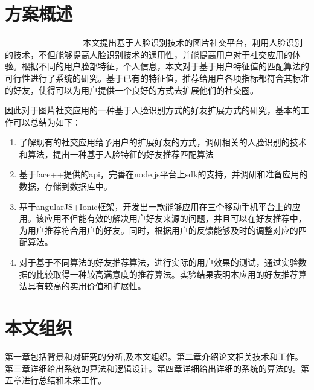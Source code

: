 \section{方案概述}
􏰉􏴳􏰭􏴴􏴵􏴶􏴷􏰿􏴸􏴹􏴘􏰏􏲦􏲜􏱲􏴺􏰭􏴻􏲆􏴻􏴼􏰏􏱦􏴷􏱜􏰒􏴽􏳯􏴾􏴿􏵀􏱾􏱜本文提出基于人脸识别技术的图片社交平台，利用人脸识别的技术，不但能够提高人脸识别技术的通用性，并能提高用户对于社交应用的体验。根据不同的用户脸部特征，个人信息，本文对于基于用户特征值的匹配算法的可行性进行了系统的研究。基于已有的特征值，推荐给用户各项指标都符合其标准的好友，使得可以为用户提供一个良好的方式去扩展他们的社交圈。


因此对于图片社交应用的一种基于人脸识别方式的好友扩展方式的研究，基本的工作可以总结为如下：
\begin{enumerate}
\item 了解现有的社交应用给予用户的扩展好友的方式，调研相关的人脸识别的技术和算法，提出一种基于人脸特征的好友推荐匹配算法
\item 基于face++提供的api，完善在node.js平台上sdk的支持，并调研和准备应用的数据，存储到数据库中。
\item 基于angularJS+Ionic框架，开发出一款能够应用在三个移动手机平台上的应用。该应用不但能有效的解决用户好友来源的问题，并且可以在好友推荐中，为用户推荐符合用户的好友。同时，根据用户的反馈能够及时的调整对应的匹配算法。
\item 对于基于不同算法的好友推荐算法，进行实际的用户效果的测试，通过实验数据的比较取得一种较高满意度的推荐算法。实验结果表明本应用的好友推荐算法具有较高的实用价值和扩展性。
\end{enumerate}

\section{本文组织}
第一章包括背景和对研究的分析,及本文组织。第二章介绍论文相关技术和工作。第三章详细给出系统的算法和逻辑设计。第四章详细给出详细的系统的算法的。第五章进行总结和未来工作。

